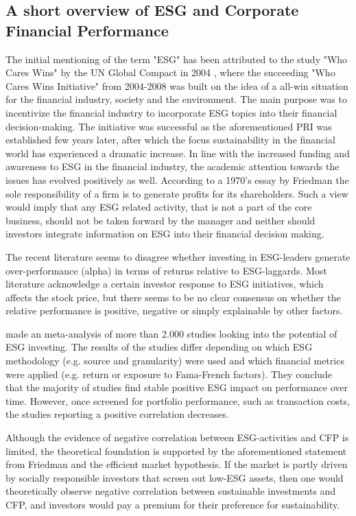 

\subsection{A short overview of ESG and Corporate Financial Performance}

The initial mentioning of the term "ESG" has been attributed to the study "Who Cares Wins"  by the UN Global Compact in 2004 \citep{WhoCaresWins}, where the succeeding "Who Cares Wins Initiative" from 2004-2008 was built on the idea of a all-win situation for the financial industry, society and the environment. The main purpose was to incentivize the financial industry to incorporate ESG topics into their financial decision-making. The initiative was successful as the aforementioned PRI was established few years later, after which the focus sustainability in the financial world has experienced a dramatic increase. In line with the increased funding and awareness to ESG in the financial industry, the academic attention towards the issues has evolved positively as well.
According to a 1970's essay by Friedman \citeyear{friedman2007} the sole responsibility of a firm is to generate profits for its shareholders. Such a view would imply that any ESG related activity, that is not a part of the core business, should not be taken forward by the manager and neither should investors integrate information on ESG into their financial decision making.

The recent literature seems to disagree whether investing in ESG-leaders generate over-performance (alpha) in terms of returns relative to ESG-laggards. Most literature acknowledge a certain investor response to ESG initiatives, which affects the stock price, but there seems to be no clear consensus on whether the relative performance is positive, negative or simply explainable by other factors. 

\cite{ESG_meta_analysis} made an meta-analysis of more than 2.000 studies looking into the potential of ESG investing. The results of the studies differ depending on which ESG methodology (e.g. source and granularity) were used and which financial metrics were applied (e.g. return or exposure to Fama-French factors). They conclude that the majority of studies find stable positive ESG impact on performance over time. However,  once screened for portfolio performance, such as transaction costs, the studies reporting a positive correlation decreases. 


Although the evidence of negative correlation between ESG-activities and CFP is limited, the theoretical foundation is supported by the aforementioned statement from Friedman and the efficient market hypothesis. If the market is partly driven by socially responsible investors that screen out low-ESG assets, then one would theoretically observe negative correlation between sustainable investments and CFP, and investors would pay a premium for their preference for sustainability. 


